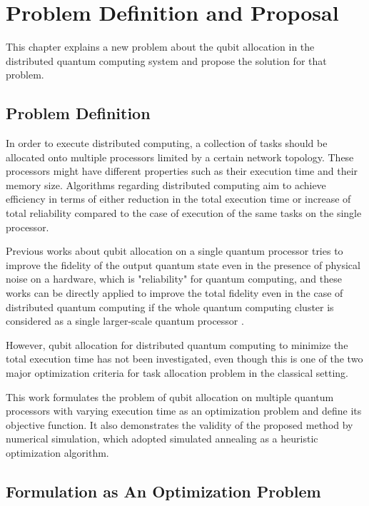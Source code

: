 \chapter{Problem Definition and Proposal}
\label{problem_definition_and_proposal}

This chapter explains a new problem about the qubit allocation in the \\ distributed quantum computing system and propose the solution for that problem.

\section{Problem Definition}

 In order to execute distributed computing, a collection of tasks should be allocated onto multiple processors limited by a certain network topology.  These processors might have different properties such as their execution time and their memory size.  Algorithms regarding distributed computing aim to achieve efficiency in terms of either reduction in the total execution time or increase of total reliability compared to the case of execution of the same tasks on the single processor.

Previous works about qubit allocation on a single quantum processor tries to improve the fidelity of the output quantum state even in the presence of physical noise on a hardware, which is "reliability" for quantum computing, and these works can be directly applied to improve the total fidelity even in the case of distributed quantum computing if the whole quantum computing cluster is considered as a single larger-scale quantum processor .

 However, qubit allocation for distributed quantum computing to minimize the total execution time has not been investigated, even though this is one of the two major optimization criteria for task allocation problem in the classical setting. 
 
 This work formulates the problem of qubit allocation on multiple quantum processors with varying execution time as an optimization problem and define its objective function.  It also demonstrates the validity of the proposed method by numerical simulation, which adopted simulated annealing as a heuristic optimization algorithm.
 
\section{Formulation as An Optimization Problem}

